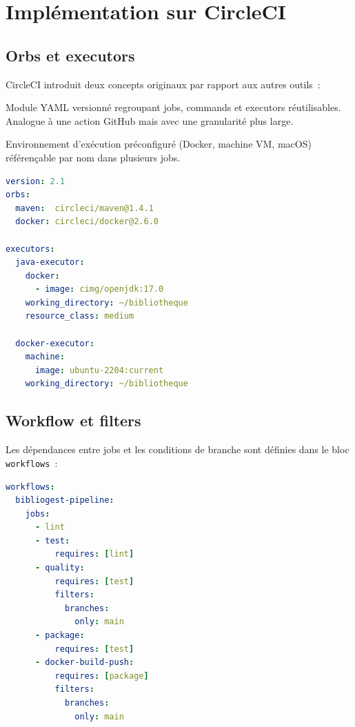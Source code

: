 \documentclass[12pt,a4paper]{report}
\begin{document}
\chapter{Implémentation sur CircleCI}
\label{ch:circleci}

\section{Orbs et executors}

CircleCI introduit deux concepts originaux par rapport aux autres outils~:

\begin{description}[leftmargin=1cm]
  \item[Orb] Module YAML versionné regroupant jobs, commands et executors
        réutilisables. Analogue à une action GitHub mais avec une granularité
        plus large.
  \item[Executor] Environnement d'exécution préconfiguré (Docker, machine VM,
        macOS) référençable par nom dans plusieurs jobs.
\end{description}

\begin{lstlisting}[language=YAML, caption={Orbs et executors CircleCI}]
version: 2.1
orbs:
  maven:  circleci/maven@1.4.1
  docker: circleci/docker@2.6.0

executors:
  java-executor:
    docker:
      - image: cimg/openjdk:17.0
    working_directory: ~/bibliotheque
    resource_class: medium

  docker-executor:
    machine:
      image: ubuntu-2204:current
    working_directory: ~/bibliotheque
\end{lstlisting}

\section{Workflow et filters}

Les dépendances entre jobs et les conditions de branche sont définies dans le
bloc \texttt{workflows}~:

\begin{lstlisting}[language=YAML, caption={Workflow CircleCI}]
workflows:
  bibliogest-pipeline:
    jobs:
      - lint
      - test:
          requires: [lint]
      - quality:
          requires: [test]
          filters:
            branches:
              only: main
      - package:
          requires: [test]
      - docker-build-push:
          requires: [package]
          filters:
            branches:
              only: main
\end{lstlisting}
\end{document}
